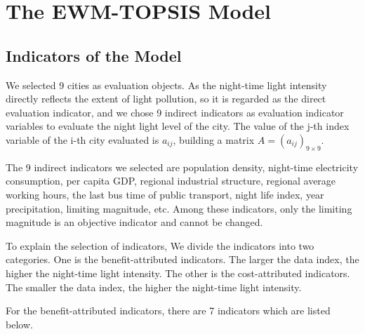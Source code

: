 \section{The EWM-TOPSIS Model}

\subsection{Indicators of the Model}
We selected 9 cities as evaluation objects. As the night-time light intensity directly reflects the extent of light pollution, so it is regarded as the direct evaluation indicator, and we chose 9 indirect indicators as evaluation indicator variables to evaluate the night light level of the city. 
The value of the j-th index variable of the i-th city evaluated is $a_{ij}$, building a matrix $A=(a_{ij})_{9\times9}$.

The 9 indirect indicators we selected are population density, night-time electricity consumption, per capita GDP, regional industrial structure, regional average working hours, the last bus time of public transport, night life index, year precipitation, limiting magnitude, etc. Among these indicators, only the limiting magnitude is an objective indicator and cannot be changed.

To explain the selection of indicators, We divide the indicators into two categories. One is the benefit-attributed indicators. The larger the data index, the higher the night-time light intensity. The other is the cost-attributed indicators. The smaller the data index, the higher the night-time light intensity.

For the benefit-attributed indicators, there are 7 indicators which are listed below.

